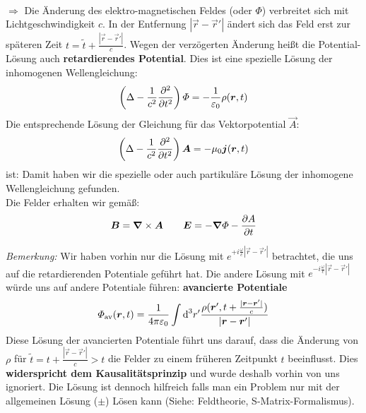 \\
$ \Rightarrow $ Die Änderung des elektro-magnetischen Feldes (oder $ \Phi $) verbreitet sich mit Lichtgeschwindigkeit $ c $. In der Entfernung $ |\vec{r} - \vec{r}'| $ ändert sich das Feld erst zur späteren Zeit $ t = \tilde{t} + \frac{|\vec{r} - \vec{r}'|}{c} $. Wegen der verzögerten Änderung heißt die Potential-Lösung auch \textbf{retardierendes Potential}.
\vspace{5pt}
\noindent
Dies ist eine spezielle Lösung der inhomogenen Wellengleichung:
\begin{equation*}
\left(\Delta - \frac{1}{c^2} \frac{\partial ^2}{\partial t^2}\right) \varPhi = - \frac{1}{\varepsilon_0} \rho(\bm{r},t)
\end{equation*}
Die entsprechende Lösung der Gleichung für das Vektorpotential $ \vec{A} $:
\begin{equation*}
\left(\Delta - \frac{1}{c^2} \frac{\partial ^2}{\partial t^2}\right) \bm{A} = - \mu_0 \bm{j}(\bm{r},t)
\end{equation*}
ist:
\vspace{5pt}
\noindent
Damit haben wir die spezielle oder auch partikuläre Lösung der inhomogene Wellengleichung gefunden.\\[10pt]
Die Felder erhalten wir gemäß:
\begin{equation*}
\bm{B} = \bm{\nabla} \times \bm{A} \qquad \bm{E} = - \bm{\nabla} \varPhi - \frac{\partial A}{\partial t}
\end{equation*}
\vspace{10pt}

\noindent
\emph{Bemerkung:} Wir haben vorhin nur die Lösung mit $ e^{+ i \frac{\omega}{c} |\vec{r} - \vec{r}'|} $ betrachtet, die uns auf die retardierenden Potentiale geführt hat. Die andere Lösung mit $ e^{- i \frac{\omega}{c} |\vec{r} - \vec{r}'|} $ würde uns auf andere Potentiale führen: \textbf{avancierte Potentiale}
\begin{equation*}
\varPhi_{\textrm{av}} (\bm{r},t) = \frac{1}{4\pi\varepsilon_0} \int \textrm{d}^3 r' \frac{\rho(\bm{r}', t + \frac{|\bm{r} - \bm{r}'|}{c})}{|\bm{r} - \bm{r}'|}
\end{equation*}
Diese Lösung der avancierten Potentiale führt uns darauf, dass die Änderung von $ \rho $ für $ \tilde{t} = t + \frac{|\vec{r} - \vec{r}'|}{c} > t $ die Felder zu einem früheren Zeitpunkt $ t $ beeinflusst. Dies \textbf{widerspricht dem Kausalitätsprinzip} und wurde deshalb vorhin von uns ignoriert. Die Lösung ist dennoch hilfreich falls man ein Problem nur mit der allgemeinen Lösung ($ \pm $) Lösen kann (Siehe: Feldtheorie, S-Matrix-Formalismus).\\

